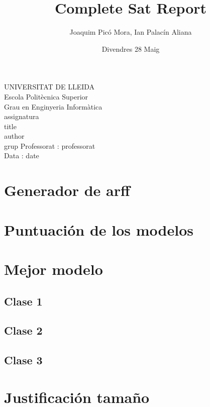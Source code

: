 \documentclass{article}
\title{Complete Sat Report}
\author{Joaquim Picó Mora, Ian Palacín Aliana}
\date{Divendres 28 Maig}
\renewcommand{\maketitle}{ %
	\begin{titlepage}
		\raggedright{UNIVERSITAT DE LLEIDA \\
			Escola Politècnica Superior \\
			Grau en Enginyeria Informàtica\\
			\1assignatura\\}
		\vspace{5cm}
		\centering\huge{\5title \\}
		\vspace{3cm}
		\large{\6author} \\
		\normalsize{\3grup}
		\vfill
		Professorat : \4professorat \\
		Data : \7date
\end{titlepage}}
\begin{document}
	\maketitle
	\thispagestyle{empty}


\section{Generador de arff}	

\section{Puntuación de los modelos}

\section{Mejor modelo}
\subsection{Clase 1}
\subsection{Clase 2}
\subsection{Clase 3}

\section{Justificación tamaño}
\end{document}
